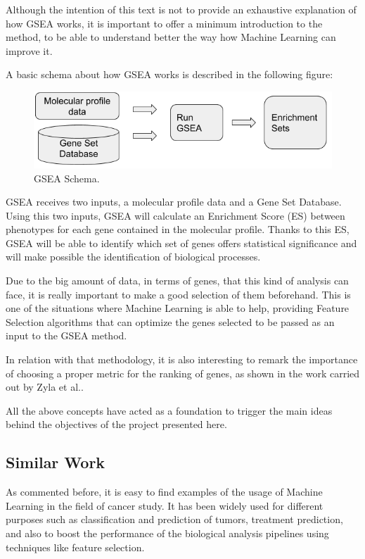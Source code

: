 Although the intention of this text is not to provide an exhaustive explanation of how GSEA works, it is important to offer a minimum introduction to the method, to be able to understand better the way how Machine Learning can improve it.

A basic schema about how GSEA works is described in the following figure:

\begin{figure}[h]
    \centering
    \includegraphics[scale=0.5]{../figs/GSEA_schema.png}
    \caption{GSEA Schema.}
    \label{fig:gsea-sch}
\end{figure}

GSEA receives two inputs, a molecular profile data and a Gene Set Database. Using this two inputs, GSEA will calculate an Enrichment Score (ES) between phenotypes for each gene contained in the molecular profile.
Thanks to this ES, GSEA will be able to identify which set of genes offers statistical significance and will make possible the identification of biological processes.

Due to the big amount of data, in terms of genes, that this kind of analysis can face, it is really important to make a good selection of them beforehand. This is one of the situations where Machine Learning is able to help, providing Feature Selection algorithms that can optimize the genes selected to be passed as an input to the GSEA method.


In relation with that methodology, it is also interesting to remark the importance of choosing a proper metric for the ranking of genes, as shown in the work carried out by Zyla et al.\cite{Zyla2017}.

All the above concepts have acted as a foundation to trigger the main ideas behind the objectives of the project presented here.
 

\subsection{Similar Work}

As commented before, it is easy to find examples of the usage of Machine Learning in the field of cancer study. It has been widely used for different purposes such as classification\cite{Chuang2007} and prediction of tumors, treatment prediction, and also to boost the performance of the biological analysis pipelines using techniques like feature selection\cite{SINGH201552}\cite{Bashiri2017}.

